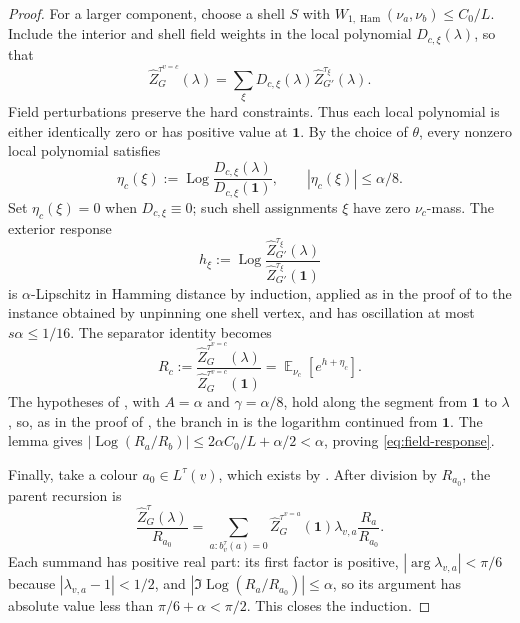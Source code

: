 \documentclass[11pt,reqno]{article}
\theoremstyle{plain}
\theoremstyle{definition}
\theoremstyle{remark}
\theoremstyle{definition}
\theoremstyle{remark}
\newcommand{\Log}{\operatorname{Log}}          %
\DeclareMathOperator{\E}{\mathbb{E}}
\DeclareMathOperator{\Ham}{Ham}
\newcommand{\WHam}{W_{1,\Ham}}                   %
\newcommand{\bcount}{b}
\newcommand{\nZpin}[2]{\widehat Z_{#1}^{#2}}
\newcommand{\hardlist}[2]{L^{#1}(#2)}
\begin{document}
\begin{proof}
For a larger component, choose a shell \(S\) with
\(\WHam(\nu_a,\nu_b)\le C_0/L\).  Include the interior and shell field
weights in the local polynomial \(D_{c,\xi}(\lambda)\), so that
\[
  \nZpin{G}{\tau^{v=c}}(\lambda)
  =\sum_\xi D_{c,\xi}(\lambda)\nZpin{G'}{\tau_\xi}(\lambda).
\]
Field perturbations preserve the hard constraints.  Thus each local
polynomial is either identically zero or has positive value at
\(\mathbf1\).  By the choice of \(\theta\), every nonzero local
polynomial satisfies
\[
  \eta_c(\xi):=\Log\frac{D_{c,\xi}(\lambda)}{D_{c,\xi}(\mathbf1)},
  \qquad |\eta_c(\xi)|\le\alpha/8.
\]
Set \(\eta_c(\xi)=0\) when \(D_{c,\xi}\equiv0\); such shell assignments
\(\xi\) have zero \(\nu_c\)-mass.  The exterior response
\[
  h_\xi:=\Log\frac{\nZpin{G'}{\tau_\xi}(\lambda)}
                    {\nZpin{G'}{\tau_\xi}(\mathbf1)}
\]
is \(\alpha\)-Lipschitz in Hamming distance by induction, applied as in
the proof of  to the instance obtained
by unpinning one shell vertex, and has oscillation at most
\(s\alpha\le1/16\).  The separator identity becomes
\[
  R_c:=\frac{\nZpin{G}{\tau^{v=c}}(\lambda)}
             {\nZpin{G}{\tau^{v=c}}(\mathbf1)}
      =\E_{\nu_c}[e^{h+\eta_c}].
\]
The hypotheses of , with \(A=\alpha\) and
\(\gamma=\alpha/8\), hold along the segment from \(\mathbf1\) to
\(\lambda\), so, as in the proof of ,
the branch in  is the logarithm continued from
\(\mathbf1\).  The lemma gives
\(|\Log(R_a/R_b)|\le2\alpha C_0/L+\alpha/2<\alpha\), proving
\eqref{eq:field-response}.

Finally, take a colour \(a_0\in\hardlist{\tau}{v}\), which exists by
.  After division by \(R_{a_0}\), the parent
recursion is
\[
  \frac{\nZpin{G}{\tau}(\lambda)}{R_{a_0}}
  =\sum_{a:\bcount_v^\tau(a)=0}
      \nZpin{G}{\tau^{v=a}}(\mathbf1)
      \lambda_{v,a}\frac{R_a}{R_{a_0}}.
\]
Each summand has positive real part: its first factor is positive,
\(|\arg\lambda_{v,a}|<\pi/6\) because \(|\lambda_{v,a}-1|<1/2\), and
\(|\Im\Log(R_a/R_{a_0})|\le\alpha\), so its argument has absolute value
less than \(\pi/6+\alpha<\pi/2\).  This closes the induction.
\end{proof}
\end{document}
